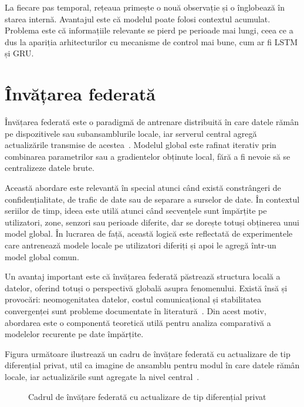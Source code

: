 La fiecare pas temporal, rețeaua primește o nouă observație și o înglobează în starea internă. Avantajul este că modelul poate folosi contextul acumulat. Problema este că informațiile relevante se pierd pe perioade mai lungi, ceea ce a dus la apariția arhitecturilor cu mecanisme de control mai bune, cum ar fi LSTM și GRU.

\section{Învățarea federată}

Învățarea federată este o paradigmă de antrenare distribuită în care datele rămân pe dispozitivele sau subansamblurile locale, iar serverul central agregă actualizările transmise de acestea~\cite{mcmahan2017fedavg, kairouz2021fl}. Modelul global este rafinat iterativ prin combinarea parametrilor sau a gradientelor obținute local, fără a fi nevoie să se centralizeze datele brute.

Această abordare este relevantă în special atunci când există constrângeri de confidențialitate, de trafic de date sau de separare a surselor de date. În contextul seriilor de timp, ideea este utilă atunci când secvențele sunt împărțite pe utilizatori, zone, senzori sau perioade diferite, dar se dorește totuși obținerea unui model global. În lucrarea de față, această logică este reflectată de experimentele care antrenează modele locale pe utilizatori diferiți și apoi le agregă într-un model global comun.

Un avantaj important este că învățarea federată păstrează structura locală a datelor, oferind totuși o perspectivă globală asupra fenomenului. Există însă și provocări: neomogenitatea datelor, costul comunicațional și stabilitatea convergenței sunt probleme documentate în literatură~\cite{kairouz2021fl}. Din acest motiv, abordarea este o componentă teoretică utilă pentru analiza comparativă a modelelor recurente pe date împărțite.

Figura următoare ilustrează un cadru de învățare federată cu actualizare de tip diferențial privat, util ca imagine de ansamblu pentru modul în care datele rămân locale, iar actualizările sunt agregate la nivel central~\cite{mcmahan2017fedavg, kairouz2021fl}.

\begin{figure}[h!]
    \centering
    \caption{Cadrul de învățare federată cu actualizare de tip diferențial privat~\cite{researchgate2024federated_dp}}
    \label{fig:federated_dp_framework}
\end{figure}

